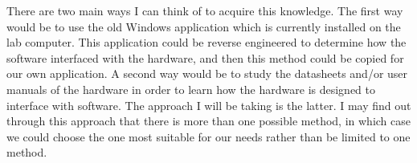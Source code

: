 \documentclass[12pt, titlepage]{article}
\begin{document}
There are two main ways I can think of to acquire this knowledge. The first way would be to use the old Windows application which is currently installed on the lab computer. This application could be reverse engineered to determine how the software interfaced with the hardware, and then this method could be copied for our own application. A second way would be to study the datasheets and/or user manuals of the hardware in order to learn how the hardware is designed to interface with software. The approach I will be taking is the latter. I may find out through this approach that there is more than one possible method, in which case we could choose the one most suitable for our needs rather than be limited to one method. 
\end{document}
